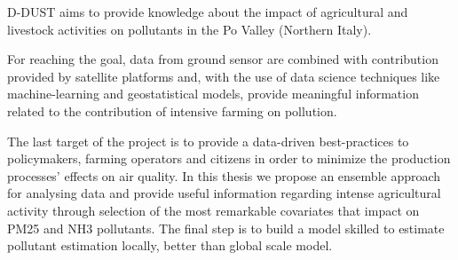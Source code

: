 D-DUST aims to provide knowledge about the impact of agricultural and livestock activities on pollutants in the Po Valley (Northern Italy).\par 
For reaching the goal, data from ground sensor are combined with contribution provided by satellite platforms and, with the use of data science techniques like machine-learning and geostatistical models, provide meaningful information related to the contribution of intensive farming on pollution.\par
The last target of the project is to provide a data-driven best-practices to policymakers, farming operators and citizens in order to minimize the production processes' effects on air quality.
\bigskip
In this thesis we propose an ensemble approach for analysing data and provide useful information regarding intense agricultural activity through selection of the most remarkable covariates that impact on PM25 and NH3 pollutants. 
The final step is to build a model skilled to estimate pollutant estimation locally, better than global scale model.  